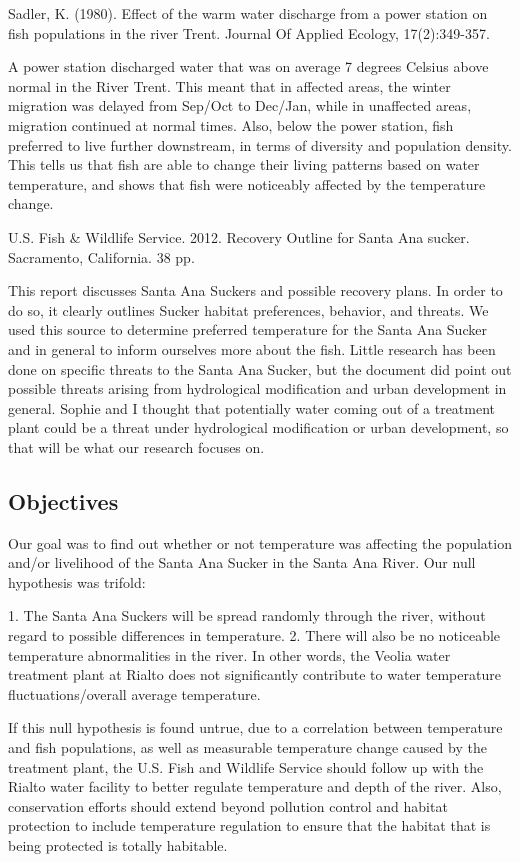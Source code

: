 \documentclass{article}\usepackage[]{graphicx}\usepackage[]{color}
\begin{document}
Sadler, K. (1980). Effect of the warm water discharge from a power station on fish populations in the river Trent. Journal Of Applied Ecology, 17(2):349-357.

A power station discharged water that was on average 7 degrees Celsius above normal in the River Trent. This meant that in affected areas, the winter migration was delayed from Sep/Oct to Dec/Jan, while in unaffected areas, migration continued at normal times. Also, below the power station, fish preferred to live further downstream, in terms of diversity and population density. This tells us that fish are able to change their living patterns based on water temperature, and shows that fish were noticeably affected by the temperature change. 

U.S. Fish \& Wildlife Service. 2012. Recovery Outline for Santa Ana sucker. Sacramento, California. 38 pp.

This report discusses Santa Ana Suckers and possible recovery plans. In order to do so, it clearly outlines Sucker habitat preferences, behavior, and threats. We used this source to determine preferred temperature for the Santa Ana Sucker and in general to inform ourselves more about the fish. Little research has been done on specific threats to the Santa Ana Sucker, but the document did point out possible threats arising from hydrological modification and urban development in general. Sophie and I thought that potentially water coming out of a treatment plant could be a threat under hydrological modification or urban development, so that will be what our research focuses on.

\subsection{Objectives}

Our goal was to find out whether or not temperature was affecting the population and/or livelihood of the Santa Ana Sucker in the Santa Ana River. Our null hypothesis was trifold:


  1. The Santa Ana Suckers will be spread randomly through the river, without regard to possible differences in temperature. 
  2. There will also be no noticeable temperature abnormalities in the river. In other words, the Veolia water treatment plant at Rialto does not significantly contribute to water temperature fluctuations/overall average temperature. 


If this null hypothesis is found untrue, due to a correlation between temperature and fish populations, as well as measurable temperature change caused by the treatment plant, the U.S. Fish and Wildlife Service should follow up with the Rialto water facility to better regulate temperature and depth of the river. Also, conservation efforts should extend beyond pollution control and habitat protection to include temperature regulation to ensure that the habitat that is being protected is totally habitable.
\end{document}

